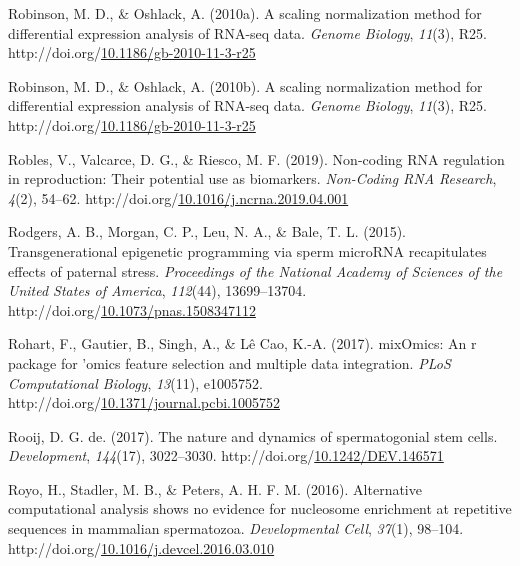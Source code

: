\documentclass[12pt,twoside]{reedthesis}
\newlength{\cslhangindent}
\newenvironment{CSLReferences}[2] %
 {%
  \setlength{\parindent}{0pt}
  \ifodd #1 \everypar{\setlength{\hangindent}{\cslhangindent}}\ignorespaces\fi
  \ifnum #2 > 0
  \setlength{\parskip}{#2\baselineskip}
  \fi
 }%
 {}
\begin{document}
\begin{CSLReferences}{1}{0}
\leavevmode{}%
Robinson, M. D., \& Oshlack, A. (2010a). A scaling normalization method for differential expression analysis of RNA-seq data. \emph{Genome Biology}, \emph{11}(3), R25. http://doi.org/\href{https://doi.org/10.1186/gb-2010-11-3-r25}{10.1186/gb-2010-11-3-r25}

\leavevmode{}%
Robinson, M. D., \& Oshlack, A. (2010b). A scaling normalization method for differential expression analysis of {RNA}-seq data. \emph{Genome Biology}, \emph{11}(3), R25. http://doi.org/\href{https://doi.org/10.1186/gb-2010-11-3-r25}{10.1186/gb-2010-11-3-r25}

\leavevmode{}%
Robles, V., Valcarce, D. G., \& Riesco, M. F. (2019). Non-coding RNA regulation in reproduction: Their potential use as biomarkers. \emph{Non-Coding RNA Research}, \emph{4}(2), 54--62. http://doi.org/\href{https://doi.org/10.1016/j.ncrna.2019.04.001}{10.1016/j.ncrna.2019.04.001}

\leavevmode{}%
Rodgers, A. B., Morgan, C. P., Leu, N. A., \& Bale, T. L. (2015). Transgenerational epigenetic programming via sperm microRNA recapitulates effects of paternal stress. \emph{Proceedings of the National Academy of Sciences of the United States of America}, \emph{112}(44), 13699--13704. http://doi.org/\href{https://doi.org/10.1073/pnas.1508347112}{10.1073/pnas.1508347112}

\leavevmode{}%
Rohart, F., Gautier, B., Singh, A., \& Lê Cao, K.-A. (2017). mixOmics: An r package for 'omics feature selection and multiple data integration. \emph{PLoS Computational Biology}, \emph{13}(11), e1005752. http://doi.org/\href{https://doi.org/10.1371/journal.pcbi.1005752}{10.1371/journal.pcbi.1005752}

\leavevmode{}%
Rooij, D. G. de. (2017). The nature and dynamics of spermatogonial stem cells. \emph{Development}, \emph{144}(17), 3022--3030. http://doi.org/\href{https://doi.org/10.1242/DEV.146571}{10.1242/DEV.146571}

\leavevmode{}%
Royo, H., Stadler, M. B., \& Peters, A. H. F. M. (2016). Alternative computational analysis shows no evidence for nucleosome enrichment at repetitive sequences in mammalian spermatozoa. \emph{Developmental Cell}, \emph{37}(1), 98--104. http://doi.org/\href{https://doi.org/10.1016/j.devcel.2016.03.010}{10.1016/j.devcel.2016.03.010}


\end{CSLReferences}
\end{document}

